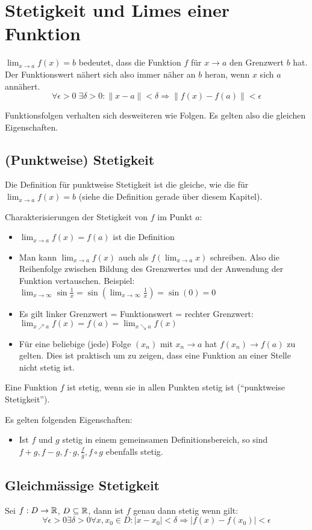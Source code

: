 \section{Stetigkeit und Limes einer Funktion}
$\lim_{x \to a} f(x) = b$ bedeutet, dass die Funktion $f$ für $x \to a$ den
Grenzwert $b$ hat. Der Funktionswert nähert sich also immer näher an $b$ heran,
wenn $x$ sich $a$ annähert.
\[
\forall \epsilon > 0 \; \exists \delta > 0: \|x -a\| < \delta \Rightarrow
\|f(x) - f(a)\| < \epsilon
\]

Funktionsfolgen verhalten sich desweiteren wie Folgen. Es gelten also die
gleichen Eigenschaften.

\subsection{(Punktweise) Stetigkeit}
Die Definition für punktweise Stetigkeit ist die gleiche, wie die für
$\lim_{x \to a} f(x) = b$ (siehe die Definition gerade über diesem Kapitel).

Charakterisierungen der Stetigkeit von $f$ im Punkt $a$:
\begin{itemize}
	\item $\lim_{x \to a} f(x) = f(a)$ ist die Definition
	\item Man kann $\lim_{x \to a} f(x)$ auch als $f(\lim_{x \to a} x)$ schreiben.
	Also die Reihenfolge zwischen Bildung des Grenzwertes und der Anwendung der
	Funktion vertauschen. Beispiel: $\lim_{x \to \infty} \sin\frac{1}{x} =
	\sin(\lim_{x \to \infty} \frac{1}{x}) = \sin(0) = 0$
	\item Es gilt linker Grenzwert = Funktionswert = rechter Grenzwert: $\lim_{x
	\nearrow a} f(x) = f(a) = \lim_{x \searrow a} f(x)$
	\item Für eine beliebige (jede) Folge $(x_n)$ mit $x_n \to a$ hat $f(x_n) \to
	f(a)$ zu gelten. Dies ist praktisch um zu zeigen, dass eine Funktion an einer
	Stelle nicht stetig ist.
\end{itemize}

Eine Funktion $f$ ist stetig, wenn sie in allen Punkten stetig ist
(``punktweise Stetigkeit'').

Es gelten folgenden Eigenschaften:
\begin{itemize}
	\item Ist $f$ und $g$ stetig in einem gemeinsamen Definitionsbereich, so sind
	$f + g, f- g, f \cdot g, \frac{f}{g}, f \circ g$ ebenfalls stetig.
\end{itemize}

\subsection{Gleichmässige Stetigkeit}
Sei $f: D \to \mathbb{R}$, $D \subseteq \mathbb{R}$, dann ist $f$ genau dann stetig wenn gilt:
\[
\forall \epsilon > 0 \exists \delta > 0 \forall x,x_0 \in D: |x - x_0| < \delta
\Rightarrow |f(x) - f(x_0)| < \epsilon
\]


